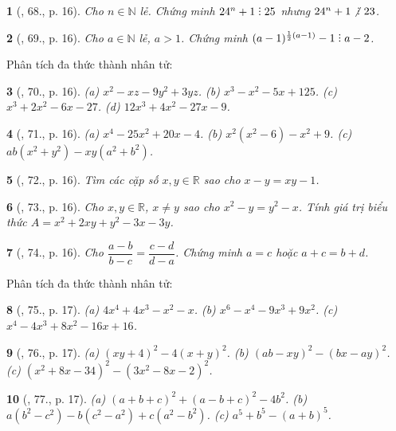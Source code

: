 \documentclass{article}
\newtheorem{baitoan}{}
\DeclareRobustCommand{\divby}{%
	\mathrel{\vbox{\baselineskip.65ex\lineskiplimit0pt\hbox{.}\hbox{.}\hbox{.}}}%
}
\begin{document}
\begin{baitoan}[\cite{Tuyen_Toan_8}, 68., p. 16]
	Cho $n\in\mathbb{N}$ lẻ. Chứng minh $24^n + 1\divby25$ nhưng $24^n + 1\not{\divby}\ 23$.
\end{baitoan}

\begin{baitoan}[\cite{Tuyen_Toan_8}, 69., p. 16]
	Cho $a\in\mathbb{N}$ lẻ, $a > 1$. Chứng minh $(a - 1)^{\frac{1}{2}(a - 1)} - 1\divby a - 2$.
\end{baitoan}
Phân tích đa thức thành nhân tử:

\begin{baitoan}[\cite{Tuyen_Toan_8}, 70., p. 16]
	(a) $x^2 - xz - 9y^2 + 3yz$. (b) $x^3 - x^2 - 5x + 125$. (c) $x^3 + 2x^2 - 6x - 27$. (d) $12x^3 + 4x^2 - 27x - 9$.
\end{baitoan}

\begin{baitoan}[\cite{Tuyen_Toan_8}, 71., p. 16]
	(a) $x^4 - 25x^2 + 20x - 4$. (b) $x^2(x^2 - 6) - x^2 + 9$. (c) $ab(x^2 + y^2) - xy(a^2 + b^2)$.
\end{baitoan}

\begin{baitoan}[\cite{Tuyen_Toan_8}, 72., p. 16]
	Tìm các cặp số $x,y\in\mathbb{R}$ sao cho $x - y = xy - 1$.
\end{baitoan}

\begin{baitoan}[\cite{Tuyen_Toan_8}, 73., p. 16]
	Cho $x,y\in\mathbb{R}$, $x\ne y$ sao cho $x^2 - y = y^2 - x$. Tính giá trị biểu thức $A = x^2 + 2xy + y^2 - 3x - 3y$.
\end{baitoan}

\begin{baitoan}[\cite{Tuyen_Toan_8}, 74., p. 16]
	Cho $\dfrac{a - b}{b - c} = \dfrac{c - d}{d - a}$. Chứng minh $a = c$ hoặc $a + c = b + d$.
\end{baitoan}
Phân tích đa thức thành nhân tử:

\begin{baitoan}[\cite{Tuyen_Toan_8}, 75., p. 17]
	(a) $4x^4 + 4x^3 - x^2 - x$. (b) $x^6 - x^4 - 9x^3 + 9x^2$. (c) $x^4 - 4x^3 + 8x^2 - 16x + 16$.
\end{baitoan}

\begin{baitoan}[\cite{Tuyen_Toan_8}, 76., p. 17]
	(a) $(xy + 4)^2 - 4(x + y)^2$. (b) $(ab - xy)^2 - (bx - ay)^2$. (c) $(x^2 + 8x - 34)^2 - (3x^2 - 8x - 2)^2$.
\end{baitoan}

\begin{baitoan}[\cite{Tuyen_Toan_8}, 77., p. 17]
	(a) $(a + b + c)^2 + (a - b + c)^2 - 4b^2$. (b) $a(b^2 - c^2) - b(c^2 - a^2) + c(a^2 - b^2)$. (c) $a^5 + b^5 - (a + b)^5$.
\end{baitoan}
\end{document}
